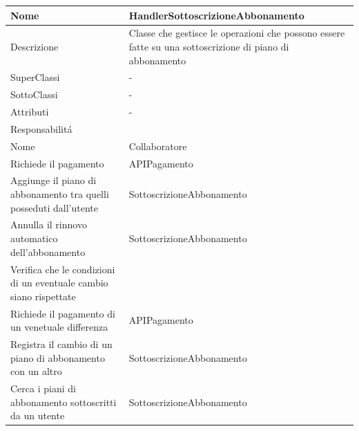 \begin{center}
    \begin{longtable}{ |p{3cm}|p{3cm}|p{3cm}|p{3cm}| }
        \hline
        Nome & \multicolumn{3}{|p{9cm}|}{HandlerSottoscrizioneAbbonamento} \\\hline
        Descrizione & \multicolumn{3}{|p{9cm}|}{Classe che gestisce le operazioni che possono essere fatte su una sottoscrizione di piano di abbonamento} \\\hline
        SuperClassi & \multicolumn{3}{|p{9cm}|}{-} \\\hline
        SottoClassi & \multicolumn{3}{|p{9cm}|}{-} \\\hline
        Attributi & \multicolumn{3}{|p{9cm}|}{-} \\\hline
        \multicolumn{4}{|p{12cm}|}{Responsabilit\'a} \\\hline
        \multicolumn{2}{|p{6cm}|}{Nome} & \multicolumn{2}{|p{6cm}|}{Collaboratore} \\\hline
        \multicolumn{2}{|p{6cm}|}{Richiede il pagamento} & \multicolumn{2}{|p{6cm}|}{APIPagamento} \\\hline
        \multicolumn{2}{|p{6cm}|}{Aggiunge il piano di abbonamento tra quelli posseduti dall'utente} & \multicolumn{2}{|p{6cm}|}{SottoscrizioneAbbonamento} \\\hline
        \multicolumn{2}{|p{6cm}|}{Annulla il rinnovo automatico dell'abbonamento} & \multicolumn{2}{|p{6cm}|}{SottoscrizioneAbbonamento} \\\hline
        \multicolumn{2}{|p{6cm}|}{Verifica che le condizioni di un eventuale cambio siano rispettate} & \multicolumn{2}{|p{6cm}|}{} \\\hline
        \multicolumn{2}{|p{6cm}|}{Richiede il pagamento di un venetuale differenza} & \multicolumn{2}{|p{6cm}|}{APIPagamento} \\\hline
        \multicolumn{2}{|p{6cm}|}{Registra il cambio di un piano di abbonamento con un altro} & \multicolumn{2}{|p{6cm}|}{SottoscrizioneAbbonamento} \\\hline
        \multicolumn{2}{|p{6cm}|}{Cerca i piani di abbonamento sottoscritti da un utente} & \multicolumn{2}{|p{6cm}|}{SottoscrizioneAbbonamento} \\\hline
    \end{longtable}
\end{center}

